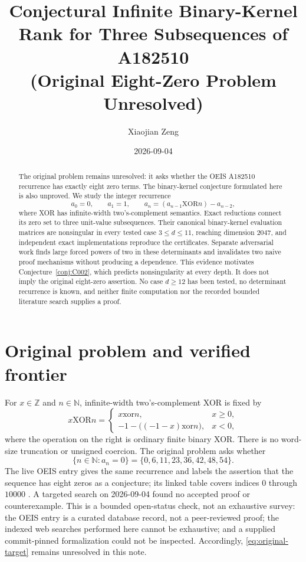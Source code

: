 \documentclass[11pt]{amsart}
\title[Conjectural Binary-Kernel Rank]{Conjectural Infinite Binary-Kernel Rank for Three Subsequences of A182510\\
(Original Eight-Zero Problem Unresolved)}
\author{Xiaojian Zeng}
\date{2026-09-04}
\theoremstyle{definition}
\begin{document}
\begin{abstract}
The original problem remains unresolved: it asks whether the OEIS A182510
recurrence has exactly eight zero terms.  The binary-kernel conjecture
formulated here is also unproved.  We study the integer
recurrence
\[
 a_0=0,\qquad a_1=1,\qquad
 a_n=(a_{n-1}\mathbin{\mathrm{XOR}}n)-a_{n-2},
\]
where XOR has infinite-width two's-complement semantics.  Exact reductions
connect its zero set to three unit-value subsequences.  Their canonical
binary-kernel evaluation matrices are nonsingular in every tested case
$3\leq d\leq11$, reaching dimension $2047$, and independent exact
implementations reproduce the certificates.  Separate adversarial work finds
large forced powers of two in these determinants and invalidates two naive
proof mechanisms without producing a dependence.  This evidence motivates
Conjecture~\ref{conj:C002}, which predicts nonsingularity at every depth.  It
does not imply the original eight-zero assertion.  No case $d\geq12$ has been
tested, no determinant recurrence is known, and neither finite computation
nor the recorded bounded literature search supplies a proof.
\end{abstract}

\maketitle

\section{Original problem and verified frontier}

For $x\in\mathbb Z$ and $n\in\mathbb N$, infinite-width two's-complement
XOR is fixed by
\[
x\mathbin{\mathrm{XOR}}n=
\begin{cases}
x\mathbin{\mathrm{xor}}n,&x\geq0,\\
-1-\bigl((-1-x)\mathbin{\mathrm{xor}}n\bigr),&x<0,
\end{cases}
\]
where the operation on the right is ordinary finite binary XOR.  There is no
word-size truncation or unsigned coercion.  The original problem asks whether
\begin{equation}\label{eq:original-target}
 \{n\in\mathbb N:a_n=0\}=\{0,6,11,23,36,42,48,54\}.
\end{equation}
The live OEIS entry gives the same recurrence and labels the assertion that
the sequence has eight zeros as a conjecture; its linked table covers indices
$0$ through $10000$ \cite{OEISA182510}.  A targeted search on 2026-09-04
found no accepted proof or counterexample.  This is a bounded open-status
check, not an exhaustive survey: the OEIS entry is a curated database record,
not a peer-reviewed proof; the indexed web searches performed here cannot be
exhaustive; and a supplied
commit-pinned formalization could not be inspected.
Accordingly, \eqref{eq:original-target} remains unresolved in this note.
\end{document}
